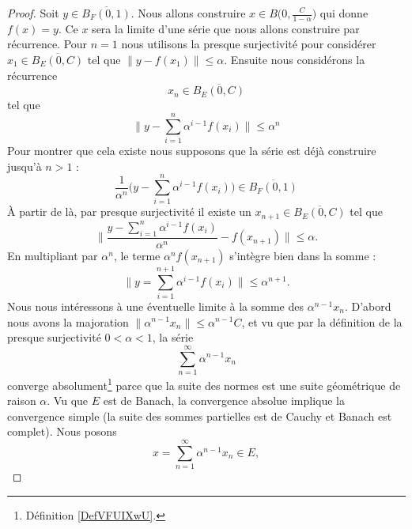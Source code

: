 \begin{proof}
    Soit \( y\in \overline{ B_F(0,1) }\). Nous allons construire \( x\in B\big( 0,\frac{ C }{ 1-\alpha } \big)\) qui donne \( f(x)=y\). Ce \( x\) sera la limite d'une série que nous allons construire par récurrence. Pour \( n=1\) nous utilisons la presque surjectivité pour considérer \( x_1\in\overline{ B_E(0,C) } \) tel que \( \| y-f(x_1) \|\leq \alpha\). Ensuite nous considérons la récurrence
    \begin{equation}
        x_n\in \overline{ B_E(0,C) }
    \end{equation}
    tel que
    \begin{equation}
        \big\| y-\sum_{i=1}^n\alpha^{i-1}f(x_i) \big\|\leq \alpha^n
    \end{equation}
    Pour montrer que cela existe nous supposons que la série est déjà construire jusqu'à \( n>1\) :
    \begin{equation}
        \frac{1}{ \alpha^n }\Big( y-\sum_{i=1}^n\alpha^{i-1}f(x_i) \Big)\in \overline{ B_F(0,1) }
    \end{equation}
    À partir de là, par presque surjectivité il existe un \( x_{n+1}\in \overline{ B_E(0,C) }\) tel que
    \begin{equation}
        \big\| \frac{ y-\sum_{i=1}^n\alpha^{i-1}f(x_i) }{ \alpha^n }-f(x_{n+1}) \big\|\leq \alpha.
    \end{equation}
    En multipliant par \( \alpha^{n}\), le terme \( \alpha^nf(x_{n+1})\) s'intègre bien dans la somme :
    \begin{equation}
        \big\| y=\sum_{i=1}^{n+1}\alpha^{i-1}f(x_i) \big\|\leq \alpha^{n+1}.
    \end{equation}
    Nous nous intéressons à une éventuelle limite à la somme des \( \alpha^{n-1}x_n\). D'abord nous avons la majoration \( \| \alpha^{n-1}x_n \|\leq \alpha^{n-1}C\), et vu que par la définition de la presque surjectivité \( 0<\alpha<1\), la série
    \begin{equation}
        \sum_{n=1}^{\infty}\alpha^{n-1}x_n
    \end{equation}
    converge absolument\footnote{Définition \ref{DefVFUIXwU}.} parce que la suite des normes est une suite géométrique de raison \( \alpha\). Vu que \( E\) est de Banach, la convergence absolue implique la convergence simple (la suite des sommes partielles est de Cauchy et Banach est complet). Nous posons
    \begin{equation}
        x=\sum_{n=1}^{\infty}\alpha^{n-1}x_n\in E,
    \end{equation}

\end{proof}
